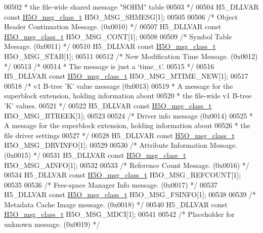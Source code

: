 \begin{DoxyCode}
00502 \textcolor{comment}{ * the file-wide shared message "SOHM" table}
00503 \textcolor{comment}{ */}
00504 H5\_DLLVAR \textcolor{keyword}{const} \hyperlink{struct_h5_o__msg__class__t}{H5O\_msg\_class\_t} H5O\_MSG\_SHMESG[1];
00505 
00506 \textcolor{comment}{/* Object Header Continuation Message. (0x0010) */}
00507 H5\_DLLVAR \textcolor{keyword}{const} \hyperlink{struct_h5_o__msg__class__t}{H5O\_msg\_class\_t} H5O\_MSG\_CONT[1];
00508 
00509 \textcolor{comment}{/* Symbol Table Message. (0x0011) */}
00510 H5\_DLLVAR \textcolor{keyword}{const} \hyperlink{struct_h5_o__msg__class__t}{H5O\_msg\_class\_t} H5O\_MSG\_STAB[1];
00511 
00512 \textcolor{comment}{/* New Modification Time Message. (0x0012) */}
00513 \textcolor{comment}{/*}
00514 \textcolor{comment}{ * The message is just a `time\_t'.}
00515 \textcolor{comment}{ */}
00516 H5\_DLLVAR \textcolor{keyword}{const} \hyperlink{struct_h5_o__msg__class__t}{H5O\_msg\_class\_t} H5O\_MSG\_MTIME\_NEW[1];
00517 
00518 \textcolor{comment}{/* v1 B-tree 'K' value message (0x0013)}
00519 \textcolor{comment}{ * A message for the superblock extension, holding information about}
00520 \textcolor{comment}{ * the file-wide v1 B-tree 'K' values.}
00521 \textcolor{comment}{ */}
00522 H5\_DLLVAR \textcolor{keyword}{const} \hyperlink{struct_h5_o__msg__class__t}{H5O\_msg\_class\_t} H5O\_MSG\_BTREEK[1];
00523 
00524 \textcolor{comment}{/* Driver info message (0x0014)}
00525 \textcolor{comment}{ * A message for the superblock extension, holding information about}
00526 \textcolor{comment}{ * the file driver settings}
00527 \textcolor{comment}{ */}
00528 H5\_DLLVAR \textcolor{keyword}{const} \hyperlink{struct_h5_o__msg__class__t}{H5O\_msg\_class\_t} H5O\_MSG\_DRVINFO[1];
00529 
00530 \textcolor{comment}{/* Attribute Information Message. (0x0015) */}
00531 H5\_DLLVAR \textcolor{keyword}{const} \hyperlink{struct_h5_o__msg__class__t}{H5O\_msg\_class\_t} H5O\_MSG\_AINFO[1];
00532 
00533 \textcolor{comment}{/* Reference Count Message. (0x0016) */}
00534 H5\_DLLVAR \textcolor{keyword}{const} \hyperlink{struct_h5_o__msg__class__t}{H5O\_msg\_class\_t} H5O\_MSG\_REFCOUNT[1];
00535 
00536 \textcolor{comment}{/* Free-space Manager Info message. (0x0017) */}
00537 H5\_DLLVAR \textcolor{keyword}{const} \hyperlink{struct_h5_o__msg__class__t}{H5O\_msg\_class\_t} H5O\_MSG\_FSINFO[1];
00538 
00539 \textcolor{comment}{/* Metadata Cache Image message. (0x0018) */}
00540 H5\_DLLVAR \textcolor{keyword}{const} \hyperlink{struct_h5_o__msg__class__t}{H5O\_msg\_class\_t} H5O\_MSG\_MDCI[1];
00541 
00542 \textcolor{comment}{/* Placeholder for unknown message. (0x0019) */}

\end{DoxyCode}
